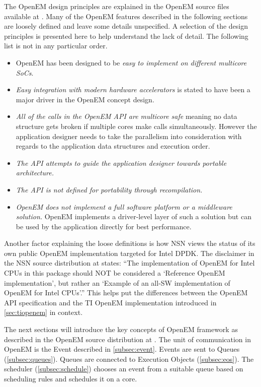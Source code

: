 The OpenEM design principles are explained in the OpenEM source files available
at \cite{openempage}. Many of the OpenEM features described in the following
sections are loosely defined and leave some details unspecified. A selection of
the design principles is presented here to help understand the lack of detail.
The following list is not in any particular order.
\begin{itemize}
    \item OpenEM has been designed to be \emph{easy to implement on different
        multicore SoCs}.
    \item \emph{Easy integration with modern hardware accelerators} is stated
        to have been a major driver in the OpenEM concept design.
    \item \emph{All of the calls in the OpenEM API are multicore safe} meaning
        no data structure gets broken if multiple cores make calls
        simultaneously. However the application designer needs to take the
        parallelism into consideration with regards to the application data
        structures and execution order.
    \item \emph{The API attempts to guide the application designer towards
        portable architecture.}
    \item \emph{The API is not defined for portability through recompilation.}
    \item \emph{OpenEM does not implement a full software platform or a
        middleware solution.} OpenEM implements a driver-level layer of such a
        solution but can be used by the application directly for best
        performance.
\end{itemize}

Another factor explaining the loose definitions is how NSN views the status of
its own public OpenEM implementation targeted for Intel DPDK. The disclaimer in
the NSN source distribution at \cite{openempage} states:
``The implementation of OpenEM for Intel CPUs in this package should
NOT be considered a `Reference OpenEM implementation', but rather an `Example of
an all-SW implementation of OpenEM for Intel CPUs'.'' This helps put the
differences between the OpenEM API specification and the TI OpenEM
implementation introduced in \ref{sec:tiopenem} in context.

The next sections will introduce the key concepts of OpenEM framework as
described in the OpenEM source distribution at \cite{openempage}. The unit of
communication in OpenEM is the Event described in \ref{subsec:event}. Events are
sent to Queues (\ref{subsec:queues}). Queues are connected to Execution Objects
(\ref{subsec:eos}). The scheduler (\ref{subsec:schedule}) chooses an event from
a suitable queue based on scheduling rules and schedules it on a core.

